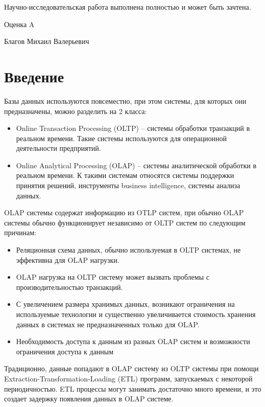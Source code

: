 \documentclass[%
bachelor,    %
subf,        %
href,        %
colorlinks,  %
]{disser}
\begin{document}
Научно-исследовательская работа выполнена полностью и может быть зачтена.

Оценка A
\begin{flushright}
Благов Михаил Валерьевич
\end{flushright}
\tableofcontents


\section{Введение}
  
Базы данных используются повсеместно, при этом системы, для которых они предназначены, можно разделить на 2 класса:
\begin{itemize}
\item Online Transaction Processing (OLTP) -- системы обработки транзакций в реальном времени. Такие системы используются для операционной деятельности предприятий.
\item Online Analytical Processing (OLAP) -- системы аналитической обработки в реальном времени. К такими системам относятся системы поддержки принятия решений, инструменты business intelligence, системы анализа данных.
\end{itemize}

OLAP системы содержат информацию из OTLP систем, при обычно OLAP системы обычно функционирует независимо от OLTP систем по следующим причинам:\cite{oltp_olap}
\begin{itemize}
	\item Реляционная схема данных, обычно используемая в OLTP системах, не эффективна для OLAP нагрузки.
	\item OLAP нагрузка на OLTP систему может вызвать проблемы с производительностью транзакций.
	\item С увеличением размера хранимых данных, возникают ограничения на используемые технологии и существенно увеличивается стоимость хранения данных в системах не предназначенных только для OLAP.
	\item Необходимость доступа к данным из разных OLAP систем и возможности ограничения доступа к данным
\end{itemize}

Традиционно, данные попадают в OLAP систему из OLTP системы при помощи Extraction-Transformation-Loading (ETL) программ,
запускаемых с некоторой периодичностью. ETL процессы могут занимать достаточно много времени, и это создает задержку появления данных в OLAP системе. 
\end{document}
